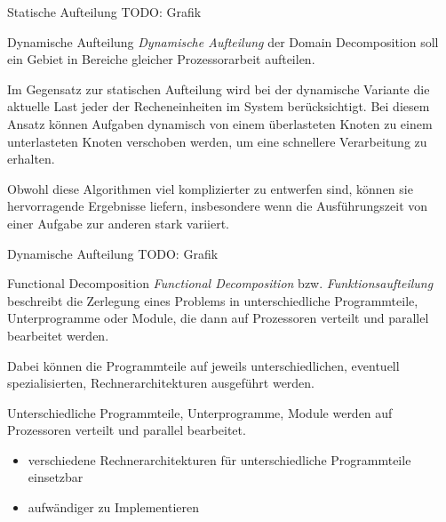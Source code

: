 \begin{example}{Statische Aufteilung}
    TODO: Grafik
\end{example}

\begin{defi}{Dynamische Aufteilung}
    \emph{Dynamische Aufteilung} der Domain Decomposition soll ein Gebiet in Bereiche gleicher Prozessorarbeit aufteilen.
    
    Im Gegensatz zur statischen Aufteilung wird bei der dynamische Variante die aktuelle Last jeder der Recheneinheiten im System berücksichtigt.
    Bei diesem Ansatz können Aufgaben dynamisch von einem überlasteten Knoten zu einem unterlasteten Knoten verschoben werden, um eine schnellere Verarbeitung zu erhalten.
    
    Obwohl diese Algorithmen viel komplizierter zu entwerfen sind, können sie hervorragende Ergebnisse liefern, insbesondere wenn die Ausführungszeit von einer Aufgabe zur anderen stark variiert.
    
\end{defi}

\begin{example}{Dynamische Aufteilung}
    TODO: Grafik
\end{example}

\begin{defi}{Functional Decomposition}
    \emph{Functional Decomposition} bzw. \emph{Funktionsaufteilung} beschreibt die Zerlegung eines Problems in unterschiedliche Programmteile, Unterprogramme oder Module, die dann auf Prozessoren verteilt und parallel bearbeitet werden.
    
    Dabei können die Programmteile auf jeweils unterschiedlichen, eventuell spezialisierten, Rechnerarchitekturen ausgeführt werden.
    
    Unterschiedliche Programmteile, Unterprogramme,
    Module werden auf Prozessoren verteilt und parallel bearbeitet.
    \begin{itemize}
        \item verschiedene Rechnerarchitekturen für unterschiedliche Programmteile einsetzbar
        \item aufwändiger zu Implementieren
    \end{itemize}
\end{defi}

